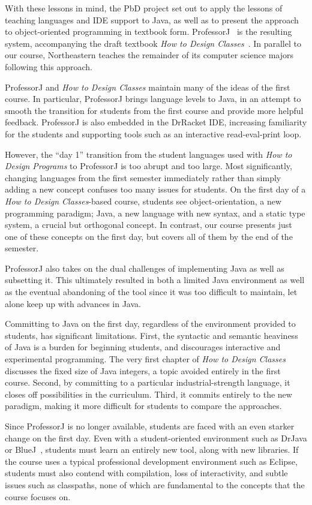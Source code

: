 \documentclass[submission,copyright]{eptcs}
\def\htdp{\emph{How to Design Programs}\xspace}
\def\htdc{\emph{How to Design Classes}\xspace}
\def\profj{{ProfessorJ}\xspace}
\begin{document}
With these lessons in mind, the PbD project set out to apply
the lessons of teaching languages and IDE support to Java, as well as
to present the approach to object-oriented programming in textbook
form. ProfessorJ~\cite{dvanhorn:Gray2003ProfessorJ} is the resulting
system, accompanying the draft textbook \emph{How to Design
  Classes}~\cite{local:htdc}.  In parallel to our course, Northeastern
teaches the remainder of its computer science majors following this
approach.

ProfessorJ and \emph{How to Design Classes} maintain many of the ideas
of the first course.  In particular, ProfessorJ brings language levels
to Java, in an attempt to smooth the transition for students from the
first course and provide more helpful feedback.  ProfessorJ is also
embedded in the DrRacket IDE, increasing familiarity for the students
and supporting tools such as an interactive read-eval-print loop.


However, the ``day 1'' transition from the student languages used with
\htdp to \profj is too abrupt and too large.
%
Most significantly, changing languages from the first semester
immediately rather than simply adding a new concept confuses too many
issues for students.  On the first day of a \htdc-based course,
students see object-orientation, a new programming paradigm; Java, a
new language with new syntax, and a static type system, a crucial but
orthogonal concept.
%
In contrast, our course presents just one of these concepts on the
first day, but  covers all of them by the end of the semester.

\profj also takes on the dual challenges of implementing Java as
well as subsetting it.  This ultimately resulted in both a limited
Java environment as well as the eventual abandoning of the tool since
it was too difficult to maintain, let alone keep up with advances in
Java.  

Committing to Java on the first day, regardless of the environment
provided to students, has significant limitations.  First, the
syntactic and semantic heaviness of Java is a burden for beginning
students, and discourages interactive and experimental programming.
The very first chapter of \htdc discusses the fixed size of Java
integers, a topic avoided entirely in the first course.  Second, by
committing to a particular industrial-strength language, it closes off
possibilities in the curriculum.  Third, it commits entirely to the
new paradigm, making it more difficult for students to compare the
approaches.

Since \profj is no longer available, students are faced with an even
starker change on the first day.  Even with a student-oriented
environment such as DrJava or BlueJ~\cite{dvanhorn:Allen2002DrJava,
  dvanhorn:Hsia2005Taming}, students must learn an entirely new tool,
along with new libraries.
If the course uses a typical professional development environment such
as Eclipse, students must also contend with compilation, loss of
interactivity, and subtle issues such as classpaths, none of which are
fundamental to the concepts that the course focuses on.
\end{document}
